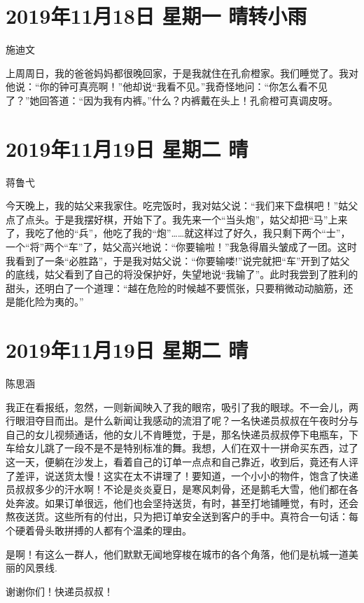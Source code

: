 \section{2019年11月18日 星期一 晴转小雨}

施迪文

上周周日，我的爸爸妈妈都很晚回家，于是我就住在孔俞橙家。我们睡觉了。我对他说：``你的钟可真亮啊！''他却说``我看不见。''我奇怪地问：``你怎么看不见了？''她回答道：``因为我有内裤。''什么？内裤戴在头上！孔俞橙可真调皮呀。

\section{2019年11月19日 星期二 晴}

蒋鲁弋

今天晚上，我的姑父来我家住。吃完饭时，我对姑父说：``我们来下盘棋吧！''姑父点了点头。于是我摆好棋，开始下了。我先来一个``当头炮''，姑父却把``马''上来了，我吃了他的``兵''，他吃了我的``炮''\ldots\ldots 就这样过了好久，我只剩下两个``士''，一个``将''两个``车''了，姑父高兴地说：``你要输啦！''我急得眉头皱成了一团。这时我看到了一条``必胜路''，于是我对姑父说：``你要输喽!''说完就把``车''开到了姑父的底线，姑父看到了自己的将没保护好，失望地说``我输了''。此时我尝到了胜利的甜头，还明白了一个道理：``越在危险的时候越不要慌张，只要稍微动动脑筋，还是能化险为夷的。''

\section{2019年11月19日 星期二 晴}

陈思涵

我正在看报纸，忽然，一则新闻映入了我的眼帘，吸引了我的眼球。不一会儿，两行眼泪夺目而出。是什么新闻让我感动的流泪了呢？一名快递员叔叔在午夜时分与自己的女儿视频通话，他的女儿不肯睡觉，于是，那名快递员叔叔停下电瓶车，下车给女儿跳了一段不是不是特别标准的舞。我想，人们在双十一拼命买东西，过了这一天，便躺在沙发上，看着自己的订单一点点和自己靠近，收到后，竟还有人评了差评，说送货太慢！这实在太不讲理了！要知道，一个小小的物件，饱含了快递员叔叔多少的汗水啊！不论是炎炎夏日，是寒风刺骨，还是鹅毛大雪，他们都在各处奔波。如果订单很远，他们也会坚持送货，有时，甚至打地铺睡觉，有时，还会熬夜送货。这些所有的付出，只为把订单安全送到客户的手中。真符合一句话：每个硬着骨头敢拼搏的人都有个温柔的理由。

是啊！有这么一群人，他们默默无闻地穿梭在城市的各个角落，他们是杭城一道美丽的风景线.

谢谢你们！快递员叔叔！

